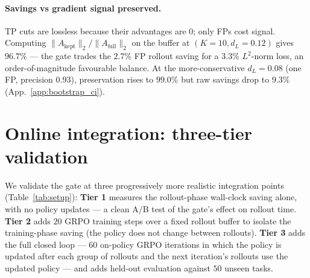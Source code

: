 \documentclass{article}
\begin{document}
\paragraph{Savings vs gradient signal preserved.}
TP cuts are lossless because their advantages are $0$; only FPs
cost signal. Computing $\|A_{\text{kept}}\|_2 / \|A_{\text{full}}\|_2$
on the buffer at $(K\!=\!10, d_L\!=\!0.12)$ gives
$\mathbf{96.7\%}$ --- the gate trades the $2.7\%$ FP rollout
saving for a $3.3\%$ $L^2$-norm loss, an order-of-magnitude
favourable balance. At the more-conservative $d_L\!=\!0.08$
(one FP, precision $0.93$), preservation rises to $99.0\%$ but
raw savings drop to $9.3\%$
(App.~\ref{app:bootstrap_ci}).


\section{Online integration: three-tier validation}
\label{sec:online}

We validate the gate at three progressively more realistic
integration points (Table~\ref{tab:setup}): \textbf{Tier 1}
measures the rollout-phase wall-clock saving alone, with no
policy updates --- a clean A/B test of the gate's effect on
rollout time. \textbf{Tier 2} adds $20$ GRPO training steps
over a fixed rollout buffer to isolate the training-phase
saving (the policy does not change between rollouts).
\textbf{Tier 3} adds the full closed loop --- $60$ on-policy
GRPO iterations in which the policy is updated after each
group of rollouts and the next iteration's rollouts use the
updated policy --- and adds held-out evaluation against $50$
unseen tasks.
\end{document}

